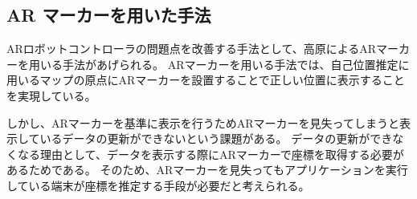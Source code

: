 \subsection{AR マーカーを用いた手法}
ARロボットコントローラの問題点を改善する手法として、高原によるARマーカーを用いる手法\cite{高原一樹2021ロボットの自己位置推定を可視化するAugmentedRealityアプリケーション}があげられる。
ARマーカーを用いる手法では、自己位置推定に用いるマップの原点にARマーカーを設置することで正しい位置に表示することを実現している。

しかし、ARマーカーを基準に表示を行うためARマーカーを見失ってしまうと表示しているデータの更新ができないという課題がある。
データの更新ができなくなる理由として、データを表示する際にARマーカーで座標を取得する必要があるためである。
そのため、ARマーカーを見失ってもアプリケーションを実行している端末が座標を推定する手段が必要だと考えられる。



%
